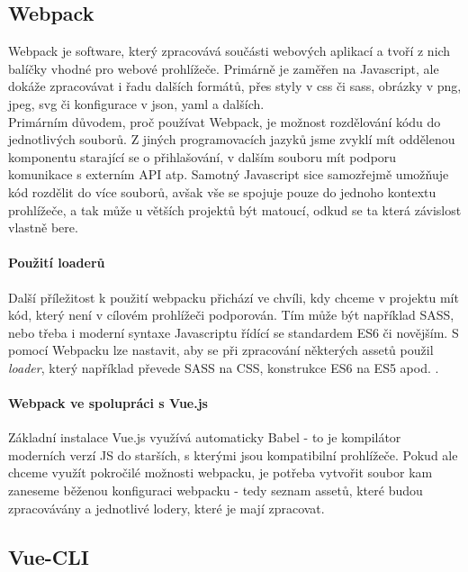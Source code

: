 \subsection{Webpack}

Webpack \cite{webpack} je software, který zpracovává součásti webových aplikací a tvoří z nich balíčky vhodné pro webové prohlížeče. Primárně je zaměřen na Javascript, ale dokáže zpracovávat i řadu dalších formátů, přes styly v css či sass, obrázky v png, jpeg, svg či konfigurace v json, yaml a dalších.\\
Primárním důvodem, proč používat Webpack, je možnost rozdělování kódu do jednotlivých souborů. Z jiných programovacích jazyků jsme zvyklí mít oddělenou komponentu starající se o přihlašování, v dalším souboru mít podporu komunikace s externím API atp. Samotný Javascript sice samozřejmě umožňuje kód rozdělit do více souborů, avšak vše se spojuje pouze do jednoho kontextu prohlížeče, a tak může u větších projektů být matoucí, odkud se ta která závislost vlastně bere.

\paragraph{Použití loaderů} Další příležitost k použití webpacku přichází ve chvíli, kdy chceme v projektu mít kód, který není v cílovém prohlížeči podporován. Tím může být například SASS, nebo třeba i moderní syntaxe Javascriptu řídící se standardem ES6 či novějším. S pomocí Webpacku lze nastavit, aby se při zpracování některých assetů použil \emph{loader}, který například převede SASS na CSS, konstrukce ES6 na ES5 apod. \cite{webpack-ackee}.

\paragraph{Webpack ve spolupráci s Vue.js} Základní instalace Vue.js využívá automaticky Babel \cite{babel} - to je kompilátor moderních verzí JS do starších, s kterými jsou kompatibilní prohlížeče. Pokud ale chceme využít pokročilé možnosti webpacku, je potřeba vytvořit soubor  kam zaneseme běženou konfiguraci webpacku - tedy seznam assetů, které budou zpracovávány a jednotlivé lodery, které je mají zpracovat.


\subsection{Vue-CLI}

